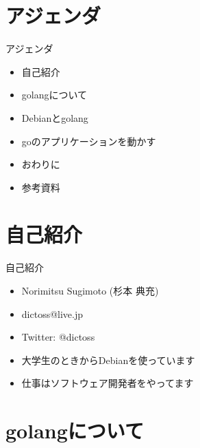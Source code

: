 \frame{\titlepage{}}


\section{アジェンダ}

\begin{frame}{アジェンダ}
  \begin{itemize}
  \item 自己紹介
  \item golangについて
  \item Debianとgolang
  \item goのアプリケーションを動かす
  \item おわりに
  \item 参考資料
  \end{itemize}
\end{frame}


\section{自己紹介}

\begin{frame}{自己紹介}
  \begin{itemize}
  \item Norimitsu Sugimoto (杉本 典充)
  \item dictoss@live.jp
  \item Twitter: @dictoss
  \item 大学生のときからDebianを使っています
  \item 仕事はソフトウェア開発者をやってます
  \end{itemize}
\end{frame}


\section{golangについて}

